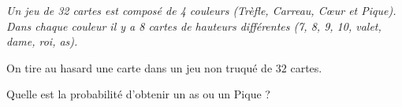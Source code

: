 
\textit{Un jeu de 32 cartes est composé de 4 couleurs (Trèfle, Carreau, Cœur et Pique). Dans chaque couleur il y a 8 cartes de hauteurs différentes (7, 8, 9, 10, valet, dame, roi, as).}

\medskip

On tire au hasard une carte dans un jeu non truqué de $32$ cartes.

Quelle est la probabilité d'obtenir un as ou un Pique ?

\smallskip
{}
